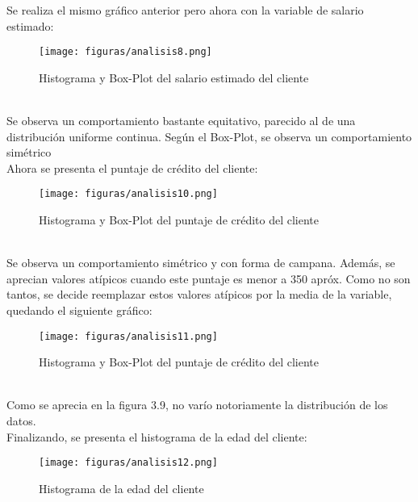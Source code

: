 \documentclass{report}
\begin{document}
Se realiza el mismo gráfico anterior pero ahora con la variable de salario estimado:\\

\begin{figure}[htp]
        \centering
    	\texttt{[image: figuras/analisis8.png]}
    	\label{fig: Figura1}
    	\caption{Histograma y Box-Plot del salario estimado del cliente}
        \end{figure}\\
        
Se observa un comportamiento bastante equitativo, parecido al de una distribución uniforme continua. Según el Box-Plot, se observa un comportamiento simétrico\\

Ahora se presenta el puntaje de crédito del cliente:\\

\begin{figure}[htp]
        \centering
    	\texttt{[image: figuras/analisis10.png]}
    	\label{fig: Figura1}
    	\caption{Histograma y Box-Plot del puntaje de crédito del cliente}
        \end{figure}\\

Se observa un comportamiento simétrico y con forma de campana. Además, se aprecian valores atípicos cuando este puntaje es menor a 350 apróx. Como no son tantos, se decide reemplazar estos valores atípicos por la media de la variable, quedando el siguiente gráfico:\\

\begin{figure}[htp]
        \centering
    	\texttt{[image: figuras/analisis11.png]}
    	\label{fig: Figura1}
    	\caption{Histograma y Box-Plot del puntaje de crédito del cliente}
        \end{figure}\\

Como se aprecia en la figura 3.9, no varío notoriamente la distribución de los datos.\\

Finalizando, se presenta el histograma de la edad del cliente:\\

        \begin{figure}[htp]
        \centering
    	\texttt{[image: figuras/analisis12.png]}
    	\label{fig: Figura1}
    	\caption{Histograma de la edad del cliente}
        \end{figure}\\
\end{document}
